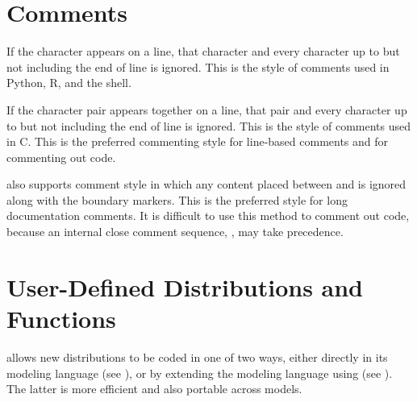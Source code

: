 \section{Comments}

If the character \code{\#} appears on a line, that character and every
character up to but not including the end of line is ignored.  This is
the style of comments used in Python, R, and the shell.  

If the character pair \code{//} appears together on a line, that pair
and every character up to but not including the end of line is
ignored.  This is the style of comments used in C.  This is the
preferred commenting style for line-based comments and for commenting
out code.

\Stan also supports \Cpp comment style in which any content placed
between \code{/*} and \code{*/} is ignored along with the boundary
markers.  This is the preferred style for long documentation comments.
It is difficult to use this method to comment out code, because 
an internal close comment sequence, \code{*/}, may take precedence.


\section{User-Defined Distributions and Functions}

\Stan allows new distributions to be coded in one of two ways, either
directly in its modeling language (see
), or by extending the
modeling language using \Cpp (see
).  The latter is more efficient
and also portable across models.

